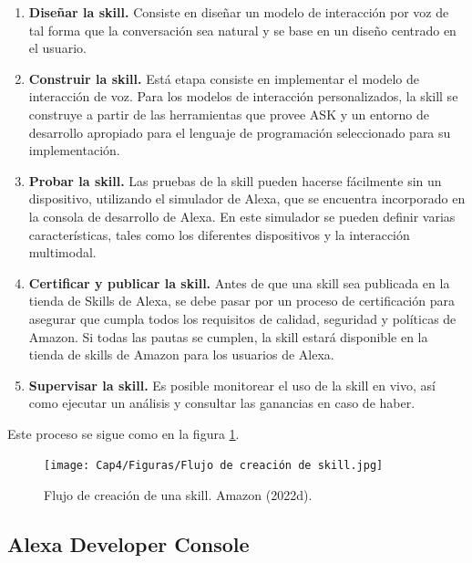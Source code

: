 \begin{enumerate}
  \item \textbf{Diseñar la skill.} Consiste en diseñar un modelo de interacción por voz de tal forma que la conversación sea natural y se base en un diseño centrado en el usuario. 
  \item \textbf{Construir la skill.} Está etapa consiste en implementar el modelo de interacción de voz. Para los modelos de interacción personalizados, la skill se construye a partir de las herramientas que provee ASK y un entorno de desarrollo apropiado para el lenguaje de programación seleccionado para su implementación.
  \item \textbf{Probar la skill.} Las pruebas de la skill pueden hacerse fácilmente sin un dispositivo, utilizando el simulador de Alexa, que se encuentra incorporado en la consola de desarrollo de Alexa. En este simulador se pueden definir varias características, tales como los diferentes dispositivos y la interacción multimodal.
  \item \textbf{Certificar y publicar la skill.} Antes de que una skill sea publicada en la tienda de Skills de Alexa, se debe pasar por un proceso de certificación para asegurar que cumpla todos los requisitos de calidad, seguridad y políticas de Amazon. Si todas las pautas se cumplen, la skill estará disponible en la tienda de skills de Amazon para los usuarios de Alexa. 
  \item \textbf{Supervisar la skill.} Es posible monitorear el uso de la skill en vivo, así como ejecutar un análisis y consultar las ganancias en caso de haber. 
\end{enumerate}

Este proceso se sigue como en la figura \ref{fig:42}.

\begin{figure}
  \centering
  \texttt{[image: Cap4/Figuras/Flujo de creación de skill.jpg]}
  \caption{Flujo de creación de una skill. Amazon (2022d).}
  \label{fig:42}
\end{figure}


\subsection{Alexa Developer Console}
\label{ADCcapIV}

